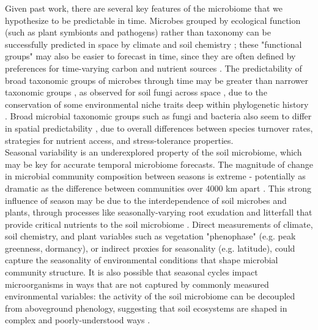 \documentclass[11pt]{article}
\begin{document}
Given past work, there are several key features of the microbiome that we hypothesize to be predictable in time. Microbes grouped by ecological function (such as plant symbionts and pathogens) rather than taxonomy can be successfully predicted in space by climate and soil chemistry \cite{averill_soil_2021}; these "functional groups" may also be easier to forecast in time, since they are often defined by preferences for time-varying carbon and nutrient sources \cite{hatosy_beta_2013,ferrenberg_changes_2013}. The predictability of broad taxonomic groups of microbes through time may be greater than narrower taxonomic groups \cite{bouskill_pre-exposure_2013,hatosy_beta_2013,ferrenberg_changes_2013,bissett_life_2010}, as observed for soil fungi across space \cite{averill_soil_2021}, due to the conservation of some environmental niche traits deep within phylogenetic history \cite{goberna_phylogenetic-scale_2018,martiny_microbiomes_2015}. Broad microbial taxonomic groups such as fungi and bacteria also seem to differ in spatial predictability \cite{averill_soil_2021}, due to overall differences between species turnover rates, strategies for nutrient access, and stress-tolerance properties. \\
Seasonal variability is an underexplored property of the soil microbiome, which may be key for accurate temporal microbiome forecasts. The magnitude of change in microbial community composition between seasons is extreme - potentially as dramatic as the difference between communities over 4000 km apart \cite{Averill}. This strong influence of season may be due to the interdependence of soil microbes and plants, through processes like seasonally-varying root exudation and litterfall that provide critical nutrients to the soil microbiome \cite{finzi_rhizosphere_2015,zhalnina_dynamic_2018,matulich_temporal_2015,chapman_biodiversity_2010}. Direct measurements of climate, soil chemistry, and plant variables such as vegetation "phenophase" (e.g. peak greenness, dormancy), or indirect proxies for seasonality (e.g. latitude), could capture the seasonality of environmental conditions that shape microbial community structure. It is also possible that seasonal cycles impact microorganisms in ways that are not captured by commonly measured environmental variables: the activity of the soil microbiome can be decoupled from aboveground phenology, suggesting that soil ecosystems are shaped in complex and poorly-understood ways \cite{abramoff_are_2015,voriskova_seasonal_2014}.  \\
\end{document}
